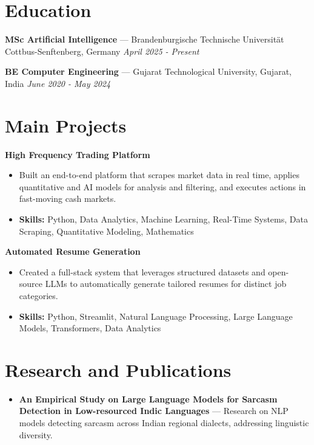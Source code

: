\documentclass[a4paper,10pt]{article}
\begin{document}
\section*{Education}
\textbf{MSc Artificial Intelligence} — Brandenburgische Technische Universität Cottbus-Senftenberg, Germany \hfill \textit{April 2025 - Present}\par
\vspace{1.5pt}
\textbf{BE Computer Engineering} — Gujarat Technological University, Gujarat, India \hfill \textit{June 2020 - May 2024}\par

\section*{Main Projects}
\textbf{High Frequency Trading Platform}\par
\vspace{1pt}
\begin{itemize}
  \item Built an end-to-end platform that scrapes market data in real time, applies quantitative and AI models for analysis and filtering, and executes actions in fast-moving cash markets.
  \item \textbf{Skills:} Python, Data Analytics, Machine Learning, Real-Time Systems, Data Scraping, Quantitative Modeling, Mathematics
\end{itemize}
\vspace{3pt}
\textbf{Automated Resume Generation}\par
\vspace{1pt}
\begin{itemize}
  \item Created a full-stack system that leverages structured datasets and open-source LLMs to automatically generate tailored resumes for distinct job categories.
  \item \textbf{Skills:} Python, Streamlit, Natural Language Processing, Large Language Models, Transformers, Data Analytics
\end{itemize}

\section*{Research and Publications}
\begin{itemize}
\item \textbf{An Empirical Study on Large Language Models for Sarcasm Detection in Low-resourced Indic Languages} — Research on NLP models detecting sarcasm across Indian regional dialects, addressing linguistic diversity.
\end{itemize}
\end{document}
